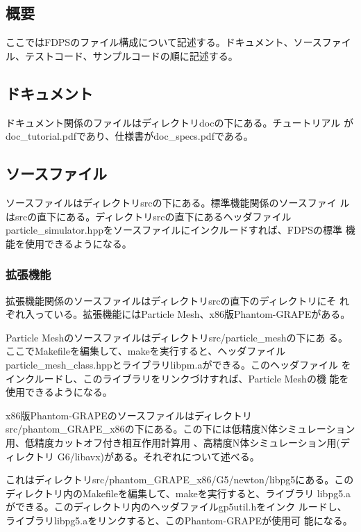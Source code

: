 \subsection{概要}

ここではFDPSのファイル構成について記述する。ドキュメント、ソースファイ
ル、テストコード、サンプルコードの順に記述する。

\subsection{ドキュメント}

ドキュメント関係のファイルはディレクトリdocの下にある。チュートリアル
がdoc\_tutorial.pdfであり、仕様書がdoc\_specs.pdfである。

\subsection{ソースファイル}

ソースファイルはディレクトリsrcの下にある。標準機能関係のソースファイ
ルはsrcの直下にある。ディレクトリsrcの直下にあるヘッダファイル
particle\_simulator.hppをソースファイルにインクルードすれば、FDPSの標準
機能を使用できるようになる。

\subsubsection{拡張機能}

拡張機能関係のソースファイルはディレクトリsrcの直下のディレクトリにそ
れぞれ入っている。拡張機能にはParticle Mesh、x86版Phantom-GRAPEがある。


Particle Meshのソースファイルはディレクトリsrc/particle\_meshの下にあ
る。ここでMakefileを編集して、makeを実行すると、ヘッダファイル
particle\_mesh\_class.hppとライブラリlibpm.aができる。このヘッダファイル
をインクルードし、このライブラリをリンクづけすれば、Particle Meshの機
能を使用できるようになる。


x86版Phantom-GRAPEのソースファイルはディレクトリ
src/phantom\_GRAPE\_x86の下にある。この下には低精度N体シミュレーション
用、低精度カットオフ付き相互作用計算用
、高精度N体シミュレーション用(ディレクトリ
G6/libavx)がある。それぞれについて述べる。


これはディレクトリsrc/phantom\_GRAPE\_x86/G5/newton/libpg5にある。この
ディレクトリ内のMakefileを編集して、makeを実行すると、ライブラリ
libpg5.aができる。このディレクトリ内のヘッダファイルgp5util.hをインク
ルードし、ライブラリlibpg5.aをリンクすると、このPhantom-GRAPEが使用可
能になる。

